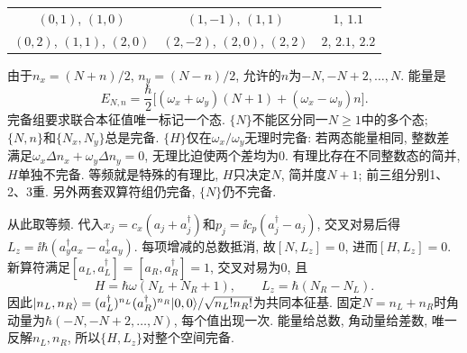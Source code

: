 \begin{solution}
\begin{center}
\begin{tabular}{ccc}
$(0,1)$, $(1,0)$ & $(1,-1)$, $(1,1)$ & $1$, $1.1$\\
$(0,2)$, $(1,1)$, $(2,0)$ & $(2,-2)$, $(2,0)$, $(2,2)$ & $2$, $2.1$, $2.2$\\\bottomrule
\end{tabular}\end{center}
由于$n_x=(N+n)/2$, $n_y=(N-n)/2$, 允许的$n$为$-N,-N+2,\ldots,N$. 能量是
\[
E_{N,n}=\frac\hbar2\bigl[(\omega_x+\omega_y)(N+1)+(\omega_x-\omega_y)n\bigr].
\]
完备组要求联合本征值唯一标记一个态. $\{N\}$不能区分同一$N\geq1$中的多个态; $\{N,n\}$和$\{N_x,N_y\}$总是完备. $\{H\}$仅在$\omega_x/\omega_y$无理时完备: 若两态能量相同, 整数差满足$\omega_x\Delta n_x+\omega_y\Delta n_y=0$, 无理比迫使两个差均为0. 有理比存在不同整数态的简并, $H$单独不完备. 等频就是特殊的有理比, $H$只决定$N$, 简并度$N+1$; 前三组分别1、2、3重. 另外两套双算符组仍完备, $\{N\}$仍不完备.

从此取等频. 代入$x_j=c_x(a_j+a_j^\dagger)$和$p_j=\ii c_p(a_j^\dagger-a_j)$, 交叉对易后得$L_z=\ii\hbar(a_y^\dagger a_x-a_x^\dagger a_y)$. 每项增减的总数抵消, 故$[N,L_z]=0$, 进而$[H,L_z]=0$. 新算符满足$[a_L,a_L^\dagger]=[a_R,a_R^\dagger]=1$, 交叉对易为0, 且
\[
H=\hbar\omega(N_L+N_R+1),\qquad L_z=\hbar(N_R-N_L).
\]
因此$\lvert n_L,n_R\rangle=(a_L^\dagger)^{n_L}(a_R^\dagger)^{n_R}\lvert 0,0\rangle/\sqrt{n_L!n_R!}$为共同本征基. 固定$N=n_L+n_R$时角动量为$\hbar(-N,-N+2,\ldots,N)$, 每个值出现一次. 能量给总数, 角动量给差数, 唯一反解$n_L,n_R$, 所以$\{H,L_z\}$对整个空间完备.
\end{solution}
